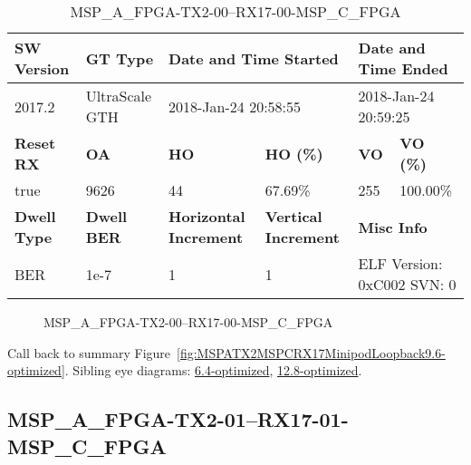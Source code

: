 \begin{table}[h]
\centering
\caption{MSP\_A\_FPGA-TX2-00--RX17-00-MSP\_C\_FPGA}
\label{tab:MSPAFPGATX200RX1700MSPCFPGA9.6-optimized}
\begin{tabular}{@{}|l|l|l|l|l|l|@{}}
\toprule
\textbf{SW Version}                & \textbf{GT Type}   & \multicolumn{2}{l|}{\textbf{Date and Time Started}}            & \multicolumn{2}{l|}{\textbf{Date and Time Ended}}        \\ \midrule
2017.2                       & UltraScale GTH          & \multicolumn{2}{l|}{2018-Jan-24 20:58:55}                   & \multicolumn{2}{l|}{2018-Jan-24 20:59:25}               \\ \midrule
\textbf{Reset RX}                  & \textbf{OA} & \textbf{HO}   & \textbf{HO (\%)} & \textbf{VO} & \textbf{VO (\%)} \\ \midrule
true & 9626        & 44          & 67.69\%        & 255        & 100.00\%       \\ \midrule
\textbf{Dwell Type}                & \textbf{Dwell BER} & \textbf{Horizontal Increment} & \textbf{Vertical Increment}    & \multicolumn{2}{l|}{\textbf{Misc Info}}                  \\ \midrule
BER                            & 1e-7        & 1        & 1           & \multicolumn{2}{l|}{ELF Version: 0xC002 SVN: 0}                         \\ \bottomrule
\end{tabular}
\end{table}

\begin{figure}[h]
\caption{MSP\_A\_FPGA-TX2-00--RX17-00-MSP\_C\_FPGA} \label{fig:MSPAFPGATX200RX1700MSPCFPGA9.6-optimized}
\end{figure}

Call back to summary Figure~\ref{fig:MSPATX2MSPCRX17MinipodLoopback9.6-optimized}.
Sibling eye diagrams: \hyperref[sec:MSPAFPGATX200RX1700MSPCFPGA6.4-optimized]{6.4-optimized}, \hyperref[sec:MSPAFPGATX200RX1700MSPCFPGA12.8-optimized]{12.8-optimized}.

\clearpage
\newpage


\subsection{MSP\_A\_FPGA-TX2-01--RX17-01-MSP\_C\_FPGA}\label{sec:MSPAFPGATX201RX1701MSPCFPGA9.6-optimized}

